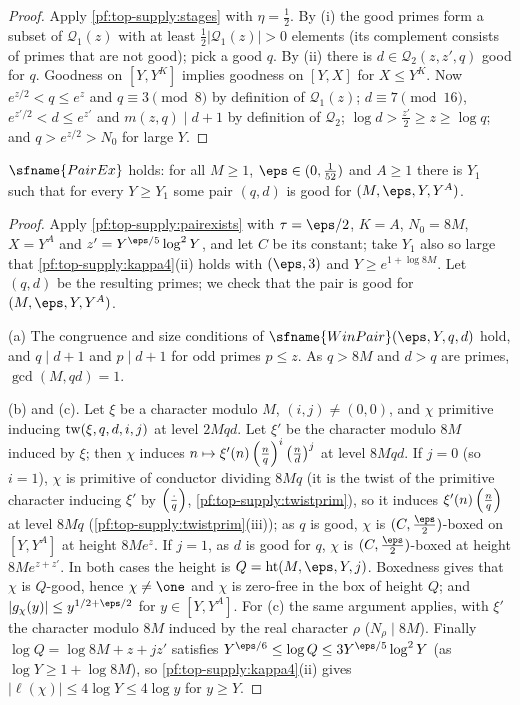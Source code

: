 \begin{proof}
Apply \cref{pf:top-supply:stages} with $\eta=\frac12$. By (i) the good primes form a subset of $\mathcal Q_1(z)$ with at
least $\frac12|\mathcal Q_1(z)|>0$ elements (its complement consists of primes that are not good); pick a good $q$. By
(ii) there is $d\in\mathcal Q_2(z,z',q)$ good for $q$. Goodness on $[Y,Y^K]$ implies goodness on $[Y,X]$ for $X\le Y^K$.
Now $e^{z/2}<q\le e^z$ and $q\equiv3\pmod8$ by definition of $\mathcal Q_1(z)$; $d\equiv7\pmod{16}$,
$e^{z'/2}<d\le e^{z'}$ and $m(z,q)\mid d+1$ by definition of $\mathcal Q_2$; $\log d>\frac{z'}2\ge z\ge\log q$; and
$q>e^{z/2}>N_0$ for large $Y$.
\end{proof}

\begin{theorem}\label{pf:top-supply:pairEx}
$\sfname{PairEx}$ holds: for all $M\ge1$, $\eps\in(0,\frac1{52})$ and $A\ge1$ there is $Y_1$ such that for every
$Y\ge Y_1$ some pair $(q,d)$ is good for $(M,\eps,Y,Y^A)$. 
\end{theorem}

\begin{proof}
Apply \cref{pf:top-supply:pairexists} with $\tau=\eps/2$, $K=A$, $N_0=8M$, $X=Y^A$ and $z'=Y^{\eps/5}\log^2Y$, and let
$C$ be its constant; take $Y_1$ also so large that \cref{pf:top-supply:kappa4}(ii) holds with $(\eps,3)$ and
$Y\ge e^{1+\log8M}$. Let $(q,d)$ be the resulting primes; we check that the pair is good for $(M,\eps,Y,Y^A)$.

(a) The congruence and size conditions of $\sfname{WinPair}(\eps,Y,q,d)$ hold, and $q\mid d+1$ and $p\mid d+1$ for odd
primes $p\le z$. As $q>8M$ and $d>q$ are primes, $\gcd(M,qd)=1$.

(b) and (c). Let $\xi$ be a character modulo $M$, $(i,j)\ne(0,0)$, and $\chi$ primitive inducing
$\operatorname{tw}(\xi,q,d,i,j)$ at level $2Mqd$. Let $\xi'$ be the character modulo $8M$ induced by $\xi$; then $\chi$ induces
$n\mapsto\xi'(n)\left(\frac{n}{q}\right)^i\left(\frac{n}{d}\right)^j$ at level $8Mqd$. If $j=0$ (so $i=1$), $\chi$ is primitive of conductor
dividing $8Mq$ (it is the twist of the primitive character inducing $\xi'$ by $\left(\frac{\cdot}{q}\right)$,
\cref{pf:top-supply:twistprim}), so it induces $\xi'(n)\left(\frac{n}{q}\right)$ at level $8Mq$
(\cref{pf:top-supply:twistprim}(iii)); as $q$ is good, $\chi$ is $(C,\frac\eps2)$-boxed on $[Y,Y^A]$ at height $8Me^z$. If $j=1$, as $d$ is
good for $q$, $\chi$ is $(C,\frac\eps2)$-boxed at height $8Me^{z+z'}$. In both cases the height is
$Q=\topsupplyht(M,\eps,Y,j)$. Boxedness gives that $\chi$ is $Q$-good, hence $\chi\ne\one$ and $\chi$ is zero-free in
the box of height $Q$; and $|g_\chi(y)|\le y^{1/2+\eps/2}$ for $y\in[Y,Y^A]$. For (c) the same argument applies, with
$\xi'$ the character modulo $8M$ induced by the real character $\rho$ ($N_\rho\mid8M$). Finally $\log Q=\log8M+z+jz'$
satisfies $Y^{\eps/6}\le\log Q\le3Y^{\eps/5}\log^2Y$ (as $\log Y\ge1+\log8M$), so \cref{pf:top-supply:kappa4}(ii)
gives $|\ell(\chi)|\le4\log Y\le4\log y$ for $y\ge Y$.
\end{proof}

